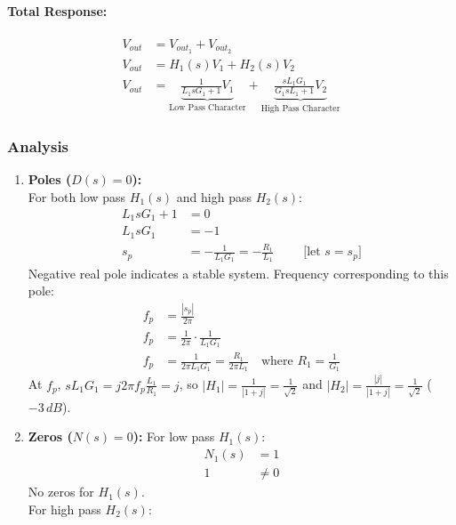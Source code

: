 \paragraph{Total Response:}
\begin{align*}
  V_{out} &= V_{out_1} + V_{out_2} \\
  V_{out} &= H_1(s) V_{1} + H_2(s) V_{2} \\
  V_{out} &= \underbrace{\frac{1}{L_1 s G_1 + 1}V_{1}}_{\text{Low Pass Character}} + \underbrace{\frac{sL_1 G_1}{G_1 s L_1 + 1}V_{2}}_{\text{High Pass Character}}
\end{align*}

\subsubsection{Analysis}
\begin{enumerate}
    \item \textbf{Poles (\(D(s) = 0\)):} \\
      For both low pass \(H_1(s)\) and high pass \(H_2(s)\):
      \begin{align*}
        L_1 s G_1 + 1 &= 0 \\
        L_1 s G_1 &= -1 \\
        s_p &= -\frac{1}{L_1 G_1} = -\frac{R_1}{L_1} \hspace{1cm} \text{[let \(s = s_p\)]}
      \end{align*}
      Negative real pole indicates a stable system. Frequency
      corresponding to this pole:
      \begin{align*}
        f_p &= \frac{|s_p|}{2\pi} \\
        f_p &= \frac{1}{2\pi}\cdot\frac{1}{L_1 G_1} \\
        f_p &= \frac{1}{2 \pi L_1 G_1} = \frac{R_1}{2 \pi L_1} \quad\text{where } R_1 = \frac{1}{G_1}
      \end{align*}
      At \(f_p\), \(sL_1 G_1 = j 2\pi f_p \frac{L_1}{R_1} = j\), so
      \(|H_1| = \frac{1}{|1 + j|} = \frac{1}{\sqrt{2}}\) and
      \(|H_2| = \frac{|j|}{|1 + j|} = \frac{1}{\sqrt{2}}\) (\(-3\,dB\)).
    \item \textbf{Zeros (\(N(s) = 0\)):}
      For low pass \(H_1(s)\):
      \begin{align*}
        N_1(s) &= 1 \\
        1 &\neq 0
      \end{align*}
      No zeros for \(H_1(s)\). \\
      For high pass \(H_2(s)\):
      \begin{align*}

\end{align*}
\end{enumerate}
